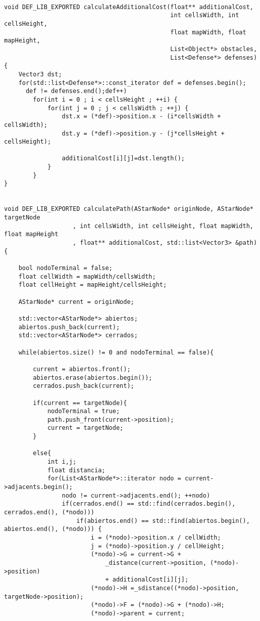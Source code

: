 \begin{lstlisting}

void DEF_LIB_EXPORTED calculateAdditionalCost(float** additionalCost,
                                              int cellsWidth, int cellsHeight,
                                              float mapWidth, float mapHeight,
                                              List<Object*> obstacles,
                                              List<Defense*> defenses)
{
    Vector3 dst;  
    for(std::list<Defense*>::const_iterator def = defenses.begin();
      def != defenses.end();def++)
        for(int i = 0 ; i < cellsHeight ; ++i) {
            for(int j = 0 ; j < cellsWidth ; ++j) {
                dst.x = (*def)->position.x - (i*cellsWidth + cellsWidth);
                dst.y = (*def)->position.y - (j*cellsHeight + cellsHeight);

                additionalCost[i][j]=dst.length();
            }
        }
}


void DEF_LIB_EXPORTED calculatePath(AStarNode* originNode, AStarNode* targetNode
                   , int cellsWidth, int cellsHeight, float mapWidth, float mapHeight
                   , float** additionalCost, std::list<Vector3> &path) {

    bool nodoTerminal = false;
    float cellWidth = mapWidth/cellsWidth;
    float cellHeight = mapHeight/cellsHeight;

    AStarNode* current = originNode;

    std::vector<AStarNode*> abiertos;
    abiertos.push_back(current);
    std::vector<AStarNode*> cerrados;

    while(abiertos.size() != 0 and nodoTerminal == false){

        current = abiertos.front();
        abiertos.erase(abiertos.begin());
        cerrados.push_back(current);

        if(current == targetNode){
            nodoTerminal = true;
            path.push_front(current->position);
            current = targetNode;
        }

        else{
            int i,j;
            float distancia;
            for(List<AStarNode*>::iterator nodo = current->adjacents.begin();
                nodo != current->adjacents.end(); ++nodo)
                if(cerrados.end() == std::find(cerrados.begin(), cerrados.end(), (*nodo)))
                    if(abiertos.end() == std::find(abiertos.begin(), abiertos.end(), (*nodo))) {
                        i = (*nodo)->position.x / cellWidth;
                        j = (*nodo)->position.y / cellHeight;
                        (*nodo)->G = current->G +
                            _distance(current->position, (*nodo)->position)
                            + additionalCost[i][j];
                        (*nodo)->H =_sdistance((*nodo)->position, targetNode->position);
                        (*nodo)->F = (*nodo)->G + (*nodo)->H;
                        (*nodo)->parent = current;


\end{lstlisting}
